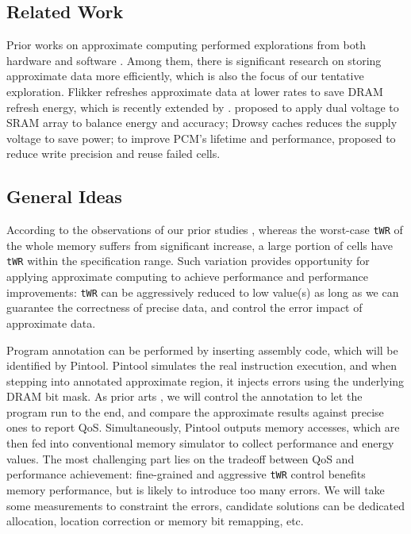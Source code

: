 \subsection{Related Work}
Prior works on approximate computing performed explorations from both hardware \cite{DATE06:cmos, DATE10:proc, ISCA10:relax, ASPLOS11:flikker, ASPLOS12:disciplined, MICRO12:neural, MICRO13:appro, MICRO14:appro, MICRO15:doppelganger} and software \cite{PLDI10:green, PLDI11:enerj, ASPLOS11:knob, OOPSLA15:topaz}. Among them, there is significant research on storing approximate data more efficiently, which is also the focus of our tentative exploration.
Flikker \cite{ASPLOS11:flikker} refreshes approximate data at lower rates to save DRAM refresh energy, which is recently extended by \cite{MEM14:sparkk, CASES15:appro}.
 proposed to apply dual voltage to SRAM array to balance energy and accuracy; Drowsy caches \cite{ISCA02:drowsy} reduces the supply voltage to save power; to improve PCM's lifetime and performance, \cite{MICRO13:appro} proposed to reduce write precision and reuse failed cells.

\subsection{General Ideas}
According to the observations of our prior studies \cite{DATE15:twr}, whereas the worst-case {\tt tWR} of the whole memory suffers from significant increase, a large portion of cells have {\tt tWR} within the specification range.
Such variation provides opportunity for applying approximate computing to achieve performance and performance improvements: {\tt tWR} can be aggressively reduced to low value(s) as long as we can guarantee the correctness of precise data, and control the error impact of approximate data.

Program annotation can be performed by inserting assembly code, which will be identified by Pintool. Pintool simulates the real instruction execution, and when stepping into annotated approximate region, it injects errors using the underlying DRAM bit mask.
As prior arts \cite{PLDI11:enerj, MICRO14:appro}, we will control the annotation to let the program run to the end, and compare the approximate results against precise ones to report QoS. Simultaneously, Pintool outputs memory accesses, which are then fed into conventional memory simulator to collect performance and energy values. The most challenging part lies on the tradeoff between QoS and performance achievement: fine-grained and aggressive {\tt tWR} control benefits memory performance, but is likely to introduce too many errors. We will take some measurements to constraint the errors, candidate solutions can be dedicated allocation, location correction or memory bit remapping, etc.

